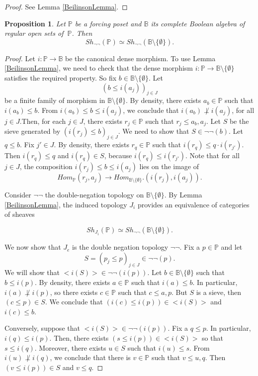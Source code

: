 \documentclass[10pt,longbibliography]{article}
\newtheorem{Prop}[Theo]{Proposition}
\newcommand{\Po}{\mathbb{P}}
\newcommand{\B}{\mathbb{B}}
\begin{document}
\begin{proof}
	See Lemma \ref{BeilinsonLemma}.
\end{proof}

\begin{Prop}
    \label{sheavesposetalgebrasem0}
	Let $\Po$ be a forcing poset and $\B$ its complete Boolean algebra of regular open sets of $~\Po$. Then
	$$Sh_{\neg \neg}(\Po) \simeq Sh_{\neg \neg}(\B \setminus \{ \emptyset\}).$$
\end{Prop}

\begin{proof}
	Let $i: \Po \to \B$ be the canonical dense morphism. To use Lemma \ref{BeilinsonLemma}, we need to check that the dense morphism $i: \Po \to \B \setminus \{\emptyset\}$ satisfies the required property. So fix $b \in \B \setminus \{\emptyset\}$. Let $$(b \leq  i(a_{j}))_{j \in J}$$ be a finite family of morphism in $\B \setminus \{\emptyset\}$. By density, there exists $a_{b} \in \Po$ such that $i(a_{b})  \leq b$. From $i(a_{b}) \leq b \leq i(a_{j})$, we conclude that $i(a_{b}) \not \perp i(a_{j})$, for all $j \in J$.Then, for each $j \in J$, there exists $r_{j} \in \Po$ such that $r_{j} \leq a_{b}, a_{j}$. Let $S$ be the sieve generated by $(i(r_{j}) \leq b)_{j \in J}$. We need to show that $S \in \neg \neg (b)$. Let $q \leq b$. Fix $j' \in J$. By density, there exists $r_{q} \in \Po$ such that $i(r_{q}) \leq q \cdot i(r_{j'})$. Then $i(r_{q}) \leq q$ and $i(r_{q}) \in S$, because $i(r_{q}) \leq i(r_{j'})$. Note that for all $j \in J$, the composition $i(r_{j}) \leq b \leq i(a_{j})$ lies on the image of 
	$$Hom_{\Po}(r_{j},a_{j}) \to Hom_{\B \setminus \{\emptyset\}}.(i(r_{j}),i(a_{j})).$$
	
	Consider $\neg \neg$ the double-negation topology on $\B \setminus \{\emptyset\}$. By Lemma \ref{BeilinsonLemma}, the induced topology $J_{i}$ provides an equivalence of categories of sheaves
	
	$$Sh_{J_{i}}(\Po) \simeq Sh_{\neg \neg}(\B \setminus \{ \emptyset \}).$$
	
	We now show that $J_{e}$ is the double negation topology $\neg \neg$. Fix a $p \in \Po$ and let $$S = (p_{j} \leq p)_{j \in J} \in \neg \neg(p).$$ We will show that  $<i(S)> \in \neg \neg (i(p))$. Let $b \in \B \setminus \{\emptyset\}$ such that $b \leq i(p)$. By density, there exists $a \in \Po$ such that $i(a) \leq b$. In particular, $i(a)\not \perp i(p)$, so there exists $c \in \Po$ such that $c \leq a,p	$. But $S$ is a sieve, then $ (c \leq p) \in S$. We conclude that $(i(c)\leq i(p)) \in <i(S)>$ and $i(c) \leq b.$
	
	Conversely, suppose that $<i(S)> \in \neg \neg (i(p))$. Fix a $q \leq p$. In particular, $i(q) \leq i(p)$. Then, there exists $(s \leq i(p)) \in <i(S)>$ so that $s \leq i(q)$. Moreover, there exists $u \in S$ such that $i(u) \leq s$. From $i(u) \not \perp i(q)$, we conclude that there is $v \in \Po$ such that $v \leq u,q$. Then $(v\leq i(p)) \in S$ and $v\leq q$.
\end{proof}
\end{document}
